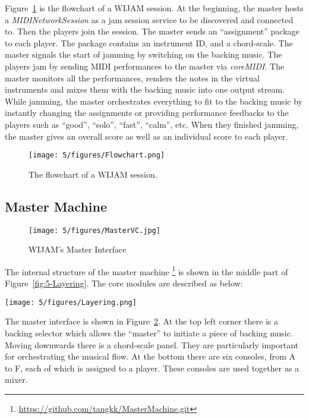 Figure~\ref{fig:5-FlowChart} is the flowchart of a WIJAM session. At the beginning, the master hosts a \textit{MIDINetworkSession} as a jam session service to be discovered and connected to. Then the players join the session. The master sends an ``assignment'' package to each player. The package contains an instrument ID, and a chord-scale. The master signals the start of jamming by switching on the backing music. The players jam by sending MIDI performances to the master via \textit{coreMIDI}. The master monitors all the performances, renders the notes in the virtual instruments and mixes them with the backing music into one output stream. While jamming, the master orchestrates everything to fit to the backing music by instantly changing the assignments or providing performance feedbacks to the players such as ``good'', ``solo'', ``fast'', ``calm'', etc. When they finished jamming, the master gives an overall score as well as an individual score to each player.
\begin{figure}[htbp]
    \centering
        \texttt{[image: 5/figures/Flowchart.png]}
    \caption{The flowchart of a WIJAM session.}
    \label{fig:5-FlowChart}
\end{figure}

\subsection{Master Machine}

\begin{figure}[htbp]
    \centering
        \texttt{[image: 5/figures/MasterVC.jpg]}
    \caption{WIJAM's Master Interface}
    \label{fig:5-MasterVC}
\end{figure}

The internal structure of the master machine \footnote{\url{https://github.com/tangkk/MasterMachine.git}} is shown in the middle part of Figure~\ref{fig:5-Layering}. The core modules are described as below:
\begin{figure*}[htbp]
    \centering
        \texttt{[image: 5/figures/Layering.png]}
    \caption{The internal layering and structure of WIJAM. The data flows between the master machine (middle) to the player machine (right) through the bidirectional communication channel.}
    \label{fig:5-Layering}
\end{figure*}

The master interface is shown in Figure~\ref{fig:5-MasterVC}. At the top left corner there is a backing selector which allows the ``master'' to initiate a piece of backing music. Moving downwards there is a chord-scale panel. They are particularly important for orchestrating the musical flow. At the bottom there are six consoles, from A to F, each of which is assigned to a player. These consoles are used together as a mixer.

